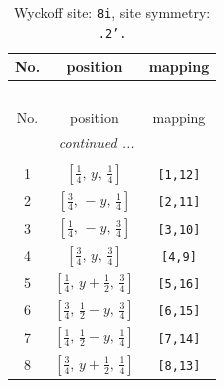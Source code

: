 \documentclass[fleqn,8pt]{jsarticle}
\begin{document}
\begin{longtable}{ccc}
\caption{Wyckoff site: {\tt 8i}, site symmetry: {\tt .2'.}}
 \\
 \hline \hline
No. & position & mapping \\ \hline \endfirsthead

\multicolumn{2}{l}{\tablename\ \thetable{}} \\
 \hline \hline
No. & position & mapping \\ \hline \endhead

 \hline \hline
\multicolumn{2}{r}{\footnotesize\it continued ...} \\ \endfoot

 \hline \hline
\multicolumn{2}{r}{} \\ \endlastfoot

1 & $\left[ \frac{1}{4},\, y,\, \frac{1}{4} \right]$ & {\tt [1,12]} \\ \hline
2 & $\left[ \frac{3}{4},\, - y,\, \frac{1}{4} \right]$ & {\tt [2,11]} \\ \hline
3 & $\left[ \frac{1}{4},\, - y,\, \frac{3}{4} \right]$ & {\tt [3,10]} \\ \hline
4 & $\left[ \frac{3}{4},\, y,\, \frac{3}{4} \right]$ & {\tt [4,9]} \\ \hline
5 & $\left[ \frac{1}{4},\, y + \frac{1}{2},\, \frac{3}{4} \right]$ & {\tt [5,16]} \\ \hline
6 & $\left[ \frac{3}{4},\, \frac{1}{2} - y,\, \frac{3}{4} \right]$ & {\tt [6,15]} \\ \hline
7 & $\left[ \frac{1}{4},\, \frac{1}{2} - y,\, \frac{1}{4} \right]$ & {\tt [7,14]} \\ \hline
8 & $\left[ \frac{3}{4},\, y + \frac{1}{2},\, \frac{1}{4} \right]$ & {\tt [8,13]} \\
\end{longtable}
\renewcommand{\arraystretch}{1.2}
\end{document}
